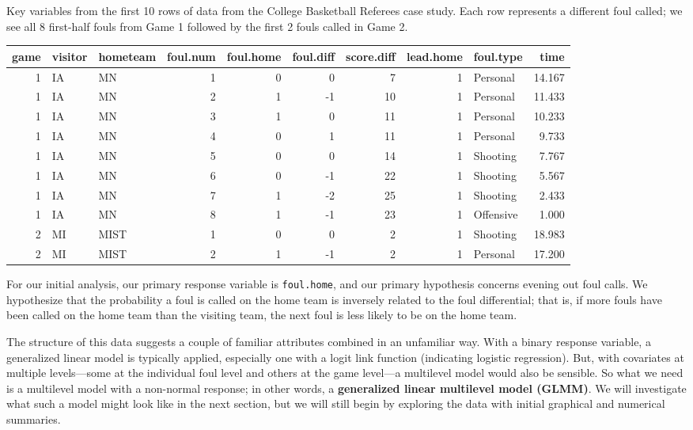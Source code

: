 \documentclass[
]{krantz}
\begin{document}
\label{tab:table1chp11} Key variables from the first 10 rows of data from the College Basketball Referees case study. Each row represents a different foul called; we see all 8 first-half fouls from Game 1 followed by the first 2 fouls called in Game 2.

\begin{table}[H]
\centering
\begin{tabular}{r|l|l|r|r|r|r|r|l|r}
\hline
game & visitor & hometeam & foul.num & foul.home & foul.diff & score.diff & lead.home & foul.type & time\\
\hline
1 & IA & MN & 1 & 0 & 0 & 7 & 1 & Personal & 14.167\\
\hline
1 & IA & MN & 2 & 1 & -1 & 10 & 1 & Personal & 11.433\\
\hline
1 & IA & MN & 3 & 1 & 0 & 11 & 1 & Personal & 10.233\\
\hline
1 & IA & MN & 4 & 0 & 1 & 11 & 1 & Personal & 9.733\\
\hline
1 & IA & MN & 5 & 0 & 0 & 14 & 1 & Shooting & 7.767\\
\hline
1 & IA & MN & 6 & 0 & -1 & 22 & 1 & Shooting & 5.567\\
\hline
1 & IA & MN & 7 & 1 & -2 & 25 & 1 & Shooting & 2.433\\
\hline
1 & IA & MN & 8 & 1 & -1 & 23 & 1 & Offensive & 1.000\\
\hline
2 & MI & MIST & 1 & 0 & 0 & 2 & 1 & Shooting & 18.983\\
\hline
2 & MI & MIST & 2 & 1 & -1 & 2 & 1 & Personal & 17.200\\
\hline
\end{tabular}
\end{table}

For our initial analysis, our primary response variable is \texttt{foul.home}, and our primary hypothesis concerns evening out foul calls. We hypothesize that the probability a foul is called on the home team is inversely related to the foul differential; that is, if more fouls have been called on the home team than the visiting team, the next foul is less likely to be on the home team.

The structure of this data suggests a couple of familiar attributes combined in an unfamiliar way. With a binary response variable, a generalized linear model is typically applied, especially one with a logit link function (indicating logistic regression). But, with covariates at multiple levels---some at the individual foul level and others at the game level---a multilevel model would also be sensible. So what we need is a multilevel model with a non-normal response; in other words, a \textbf{generalized linear multilevel model (GLMM)}. We will investigate what such a model might look like in the next section, but we will still begin by exploring the data with initial graphical and numerical summaries.
\end{document}
